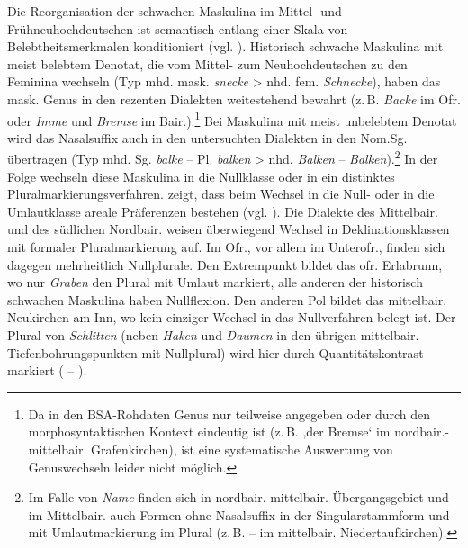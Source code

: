 Die Reorganisation der schwachen Maskulina im Mittel- und Frühneuhochdeutschen ist semantisch entlang einer Skala von Belebtheitsmerkmalen konditioniert (vgl. ). Historisch schwache Maskulina mit meist belebtem Denotat, die vom Mittel- zum Neuhochdeutschen zu den Feminina wechseln (Typ mhd. mask. \textit{snecke} > nhd. fem. \textit{Schnecke}), haben das mask. Genus in den rezenten Dialekten weitestehend bewahrt (z.\,B. \textit{Backe} im Ofr. oder \textit{Imme} und \textit{Bremse} im Bair.).\footnote{Da in den BSA-Rohdaten Genus nur teilweise angegeben oder durch den morphosyntaktischen Kontext eindeutig ist (z.\,B.   ‚der Bremse‘ im nordbair.-mittelbair. Grafenkirchen), ist eine systematische Auswertung von Genuswechseln leider nicht möglich.} Bei Maskulina mit meist unbelebtem Denotat wird das Nasalsuffix auch in den untersuchten Dialekten in den Nom.Sg. übertragen (Typ mhd. Sg. \textit{balke} -- Pl. \textit{balken} > nhd. \textit{Balken} -- \textit{Balken}).\footnote{Im Falle von \textit{Name} finden sich in nordbair.-mittelbair. Übergangsgebiet und im Mittelbair. auch Formen ohne Nasalsuffix in der Singularstammform und mit Umlautmarkierung im Plural (z.\,B.  --  im mittelbair. Niedertaufkirchen).} In der Folge wechseln diese Maskulina in die Nullklasse oder in ein distinktes Pluralmarkierungsverfahren.  zeigt, dass beim Wechsel in die Null- oder in die Umlautklasse areale Präferenzen bestehen (vgl. \citealt[§9]{Schübel1955}). Die Dialekte des Mittelbair. und des südlichen Nordbair. weisen überwiegend Wechsel in Deklinationsklassen mit formaler Pluralmarkierung auf. Im Ofr., vor allem im Unterofr., finden sich dagegen mehrheitlich Nullplurale. Den Extrempunkt bildet das ofr. Erlabrunn, wo nur \textit{Graben} den Plural mit Umlaut markiert, alle anderen der historisch schwachen Maskulina haben Nullflexion. Den anderen Pol bildet das mittelbair. Neukirchen am Inn, wo kein einziger Wechsel in das Nullverfahren belegt ist. Der Plural von \textit{Schlitten} (neben \textit{Haken} und \textit{Daumen} in den übrigen mittelbair. Tiefenbohrungspunkten mit Nullplural) wird hier durch Quantitätskontrast markiert ( -- ).

